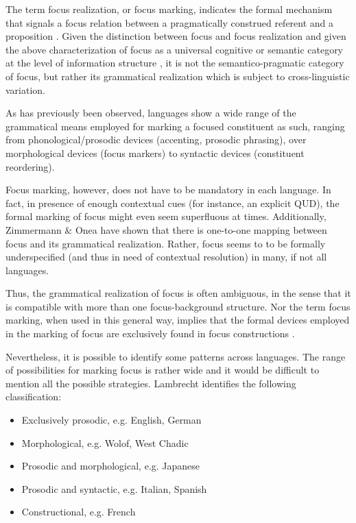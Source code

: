 \documentclass[12pt]{report}
\begin{document}
 The term focus realization, or focus marking, indicates the formal mechanism that signals a focus relation between a pragmatically construed referent and a proposition \cite{lambrecht1996information}.
Given the distinction between focus and focus realization and given the above characterization of focus as a universal cognitive or semantic category at the level of information structure \cite{zimmermann2011focus}, it is not the semantico-pragmatic category of focus, but rather its grammatical realization which is subject to cross-linguistic variation. 

As has previously been observed, languages show a wide range of the grammatical means employed for marking a focused constituent as such, ranging from phonological/prosodic devices (accenting, prosodic phrasing), over morphological devices (focus markers) to syntactic devices (constituent reordering).

Focus marking, however, does not have to be mandatory in each language. In fact, in presence of enough contextual cues (for instance, an explicit QUD), the formal marking of focus might even seem superfluous at times.
Additionally, Zimmermann \& Onea \cite{zimmermann2011grammatical} have shown that there is one-to-one mapping between focus and its grammatical realization. Rather, focus seems to to be formally underspecified (and thus in need of contextual resolution) in many, if not all languages. 

Thus, the grammatical realization of focus is often ambiguous, in the sense that it is compatible with more than one focus-background structure. Nor the term focus marking, when used in this general way, implies that the formal devices employed in the marking of focus are exclusively found in focus constructions \cite{fiedler2006subject}.


Nevertheless, it is possible to identify some patterns across languages. The range of possibilities for marking focus is rather wide and it would be difficult to mention all the possible strategies. Lambrecht \cite{lambrecht1996information} identifies the following classification: 

\begin{itemize}
    \item Exclusively prosodic, e.g. English, German
    \vspace{-0.3cm}
    \item Morphological, e.g. Wolof, West Chadic
     \vspace{-0.3cm}
    \item Prosodic and morphological, e.g. Japanese
     \vspace{-0.3cm}
    \item Prosodic and syntactic, e.g. Italian, Spanish
     \vspace{-0.3cm}
    \item Constructional, e.g. French
\end{itemize}
\end{document}
